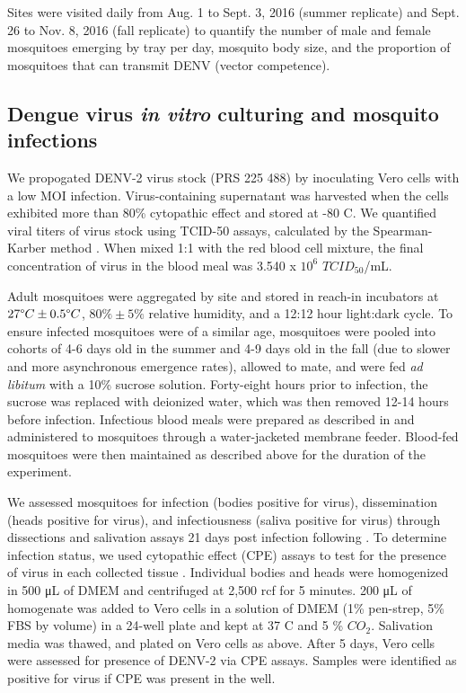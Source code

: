 \documentclass[12pt]{article}
\begin{document}
Sites were visited daily from Aug. 1 to Sept. 3, 2016 (summer replicate) and Sept. 26 to Nov. 8, 2016 (fall replicate) to quantify the number of male and female mosquitoes emerging by tray per day, mosquito body size, and the proportion of mosquitoes that can transmit DENV (vector competence).

\subsection{Dengue virus \textit{in vitro} culturing and mosquito infections}
We propogated DENV-2 virus stock (PRS 225 488) by inoculating Vero cells with a low MOI infection. Virus-containing supernatant was harvested when the cells exhibited more than 80\% cytopathic effect and stored at -80 \degree C. We quantified viral titers of virus stock using TCID-50 assays, calculated by the Spearman-Karber method \citep{shao2016}. When mixed 1:1 with the red blood cell mixture, the final concentration of virus in the blood meal was 3.540 x $10^6$ $TCID_{50}$/mL.

Adult mosquitoes were aggregated by site and stored in reach-in incubators at $27 \degree C \pm 0.5 \degree C$, $80\% \pm 5\%$ relative humidity, and a 12:12 hour light:dark cycle. To ensure infected mosquitoes were of a similar age, mosquitoes were pooled into cohorts of 4-6 days old in the summer and 4-9 days old in the fall (due to slower and more asynchronous emergence rates), allowed to mate, and were fed \textit{ad libitum} with a 10\% sucrose solution. Forty-eight hours prior to infection, the sucrose was replaced with deionized water, which was then removed 12-14 hours before infection. Infectious blood meals were prepared as described in \citet{shan2016} and administered to mosquitoes through a water-jacketed membrane feeder. Blood-fed mosquitoes were then maintained as described above for the duration of the experiment.

We assessed mosquitoes for infection (bodies positive for virus), dissemination (heads positive for virus), and infectiousness (saliva positive for virus) through dissections and salivation assays 21 days post infection following \citet{tesla2017}. To determine infection status, we used cytopathic effect (CPE) assays to test for the presence of virus in each collected tissue \citep{balaya1969}. Individual bodies and heads were homogenized in 500 \si{\micro\liter} of DMEM and centrifuged at 2,500 rcf for 5 minutes. 200 \si{\micro\liter} of homogenate was added to Vero cells in a solution of DMEM (1\% pen-strep, 5\% FBS by volume) in a 24-well plate and kept at 37 \degree C and 5 \% ${CO_2}$. Salivation media was thawed, and plated on Vero cells as above. After 5 days, Vero cells were assessed for presence of DENV-2 via CPE assays. Samples were identified as positive for virus if CPE was present in the well.
\end{document}
